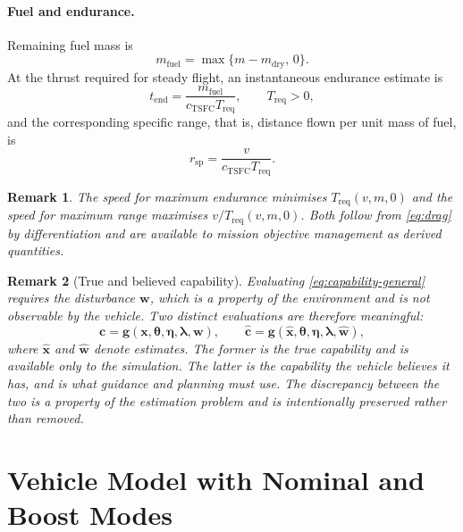 \documentclass[11pt,a4paper]{article}
\newtheorem{remark}{Remark}
\newcommand{\vecx}{\bm{x}}
\newcommand{\vecw}{\bm{w}}
\newcommand{\vecc}{\bm{c}}
\newcommand{\vectheta}{\bm{\theta}}
\newcommand{\veceta}{\bm{\eta}}
\newcommand{\veclambda}{\bm{\lambda}}
\newcommand{\vecg}{\bm{g}}
\begin{document}
\paragraph{Fuel and endurance.}
Remaining fuel mass is
\begin{equation}
  m_{\mathrm{fuel}} = \max\{m - m_{\mathrm{dry}},\, 0\} .
\end{equation}
At the thrust required for steady flight, an instantaneous endurance estimate is
\begin{equation}
  t_{\mathrm{end}} = \frac{m_{\mathrm{fuel}}}{c_{\mathrm{TSFC}} T_{\mathrm{req}}},
  \qquad T_{\mathrm{req}} > 0,
  \label{eq:endurance}
\end{equation}
and the corresponding specific range, that is, distance flown per unit mass of
fuel, is
\begin{equation}
  r_{\mathrm{sp}} = \frac{v}{c_{\mathrm{TSFC}} T_{\mathrm{req}}} .
  \label{eq:specific-range}
\end{equation}

\begin{remark}
The speed for maximum endurance minimises $T_{\mathrm{req}}(v,m,0)$ and the
speed for maximum range maximises $v / T_{\mathrm{req}}(v,m,0)$. Both follow from
\cref{eq:drag} by differentiation and are available to mission objective
management as derived quantities.
\end{remark}

\begin{remark}[True and believed capability]
\label{rem:true-believed}
Evaluating \cref{eq:capability-general} requires the disturbance $\vecw$, which
is a property of the environment and is not observable by the vehicle. Two
distinct evaluations are therefore meaningful:
\begin{equation}
  \vecc = \vecg(\vecx, \vectheta, \veceta, \veclambda, \vecw),
  \qquad
  \hat{\vecc} = \vecg(\hat{\vecx}, \vectheta, \veceta, \veclambda, \hat{\vecw}),
\end{equation}
where $\hat{\vecx}$ and $\hat{\vecw}$ denote estimates. The former is the true
capability and is available only to the simulation. The latter is the capability
the vehicle believes it has, and is what guidance and planning must use. The
discrepancy between the two is a property of the estimation problem and is
intentionally preserved rather than removed.
\end{remark}

\section{Vehicle Model with Nominal and Boost Modes}
\end{document}
